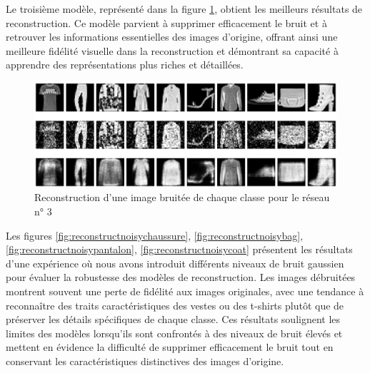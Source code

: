 \documentclass{article}
\begin{document}
Le troisième modèle, représenté dans la figure \ref{fig:reconstruct_noisy_all_big}, obtient les meilleurs résultats de reconstruction. Ce modèle parvient à supprimer efficacement le bruit et à retrouver les informations essentielles des images d'origine, offrant ainsi une meilleure fidélité visuelle dans la reconstruction et démontrant sa capacité à apprendre des représentations plus riches et détaillées.

\begin{figure}[htbp]
    \centering
    \includegraphics*[width=\textwidth]{reconstruct_noisy_all_big.pdf}
    \caption{Reconstruction d'une image bruitée de chaque classe pour le réseau n° 3}
    \label{fig:reconstruct_noisy_all_big}
\end{figure}

Les figures \ref{fig:reconstructnoisychaussure}, \ref{fig:reconstructnoisybag}, \ref{fig:reconstructnoisypantalon}, \ref{fig:reconstructnoisycoat} présentent les résultats d'une expérience où nous avons introduit différents niveaux de bruit gaussien pour évaluer la robustesse des modèles de reconstruction. Les images débruitées montrent souvent une perte de fidélité aux images originales, avec une tendance à reconnaître des traits caractéristiques des vestes ou des t-shirts plutôt que de préserver les détails spécifiques de chaque classe. Ces résultats soulignent les limites des modèles lorsqu'ils sont confrontés à des niveaux de bruit élevés et mettent en évidence la difficulté de supprimer efficacement le bruit tout en conservant les caractéristiques distinctives des images d'origine.
\end{document}
